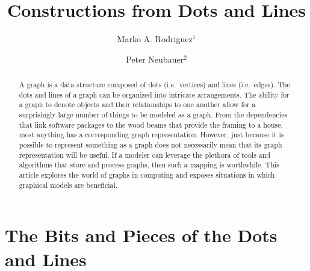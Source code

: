 \documentclass{svmult}
\begin{document}
\title*{Constructions from Dots and Lines}
\author{Marko A. Rodriguez$^1$ \and Peter Neubauer$^2$}


\maketitle


\begin{abstract}
A graph is a data structure composed of dots (i.e.~vertices) and lines (i.e.~edges). The dots and lines of a graph can be organized into intricate arrangements. The ability for a graph to denote objects and their relationships to one another allow for a surprisingly large number of things to be modeled as a graph. From the dependencies that link software packages to the wood beams that provide the framing to a house, most anything has a corresponding graph representation. However, just because it is possible to represent something as a graph does not necessarily mean that its graph representation will be useful. If a modeler can leverage the plethora of tools and algorithms that store and process graphs, then such a mapping is worthwhile. This article explores the world of graphs in computing and exposes situations in which graphical models are beneficial.
\end{abstract}

\section{The Bits and Pieces of the Dots and Lines}
\end{document}
